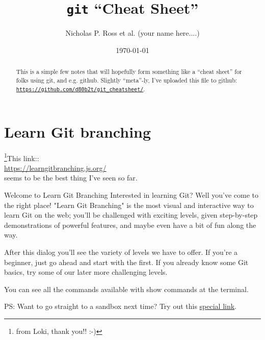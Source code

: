 \documentclass[11pt,a4paper]{article}
\begin{document}
\title{{\tt git} ``Cheat Sheet''}
\author{Nicholas P. Ross et al. (your name here....)}
\date{\today}
\maketitle



\begin{abstract}
This is a simple few notes that will hopefully form something like a ``cheat sheet'' for 
folks using git, and e.g. github. Slightly ``meta''-ly, I've uploaded this file to github:\\
\href{https://github.com/d80b2t/git\_cheatsheet}{{\tt https://github.com/d80b2t/git\_cheatsheet/}}.
\end{abstract}



\newpage
\section{Learn Git branching}

\footnote{from Loki, thank you!! :-)}This link:: \\
\href{https://learngitbranching.js.org/}{https://learngitbranching.js.org/} \\
seems to be the best thing I've seen so far.

\weeskip
Welcome to Learn Git Branching
Interested in learning Git? Well you've come to the right place! "Learn Git Branching" is the most visual and interactive way to learn Git on the web; you'll be challenged with exciting levels, given step-by-step demonstrations of powerful features, and maybe even have a bit of fun along the way.

\weeskip
After this dialog you'll see the variety of levels we have to offer. If you're a beginner, just go ahead and start with the first. If you already know some Git basics, try some of our later more challenging levels.

\weeskip
You can see all the commands available with show commands at the terminal.

\weeskip
PS: Want to go straight to a sandbox next time? Try out this \href{https://learngitbranching.js.org/?NODEMO}{special link}.
\end{document}
